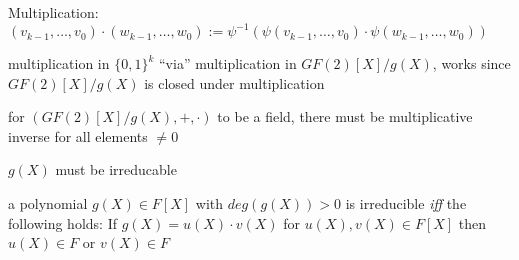\documentclass[landscape, a4paper]{article}
\begin{document}
\begin{minipage}[t]{0.198\pagewidth}
\begin{betterlist}
\begin{betterlist}
\begin{betterlist}
				\item \alert{Multiplication}: $\left(v_{k-1}, \ldots, v_0\right) \cdot\left(w_{k-1}, \ldots, w_0\right):=\psi^{-1}\left(\psi\left(v_{k-1}, \ldots, v_0\right) \cdot \psi\left(w_{k-1}, \ldots, w_0\right)\right)$
				\begin{betterlist}
					\item multiplication in $\{0,1\}^k$ \enquote{via} multiplication in $GF(2)[X]/g(X)$, works since $GF(2)[X]/g(X)$ is closed under multiplication%
				\end{betterlist}
			\end{betterlist}
			\begin{betterlist}
				\item for $(GF(2)[X]/g(X), +, \cdot)$ to be a field, there must be multiplicative inverse for all elements $\ne 0$
				\begin{betterlist}
					\item $g(X)$ must be \alert{irreducable}
					\item a polynomial $g(X) \in F[X]$ with $deg(g(X)) > 0$ is \alert{irreducible} \textit{iff} the following holds: If $g(X) = u(X) \cdot v(X)$ for $u(X), v(X) \in F[X]$ then $u(X) \in F$ or $v(X) \in F$
					\begin{betterlist}

\end{betterlist}
\end{betterlist}
\end{betterlist}
\end{betterlist}
\end{betterlist}
\end{minipage}
\end{document}

